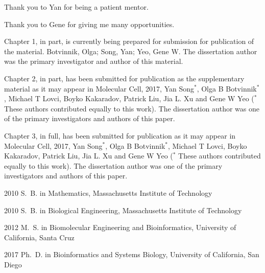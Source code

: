 \begin{frontmatter}
\listoffigures  %
\listoftables   %



%
%
\begin{acknowledgements}
Thank you to Yan for being a patient mentor.
 
Thank you to Gene for giving me many opportunities.

Chapter 1, in part, is currently being prepared for submission for publication of the material. Botvinnik, Olga; Song, Yan; Yeo, Gene W. The dissertation author was the primary investigator and author of this material. 
 
Chapter 2, in part, has been submitted for publication as the supplementary material as it may appear in Molecular Cell, 2017, Yan Song$^*$, Olga B Botvinnik$^*$, Michael T Lovci, Boyko Kakaradov, Patrick Liu, Jia L. Xu and Gene W Yeo ($^*$ These authors contributed equally to this work).  The dissertation author was one of the primary investigators and authors of this paper. 

Chapter 3, in full, has been submitted for publication as it may appear in Molecular Cell, 2017, Yan Song$^*$, Olga B Botvinnik$^*$, Michael T Lovci, Boyko Kakaradov, Patrick Liu, Jia L. Xu and Gene W Yeo ($^*$ These authors contributed equally to this work).  The dissertation author was one of the primary investigators and authors of this paper. 

\end{acknowledgements}


%
%
\begin{vitapage}
\begin{vita}
  \item[2010] S.~B. in Mathematics, Massachusetts Institute of Technology
  \item[2010] S.~B. in Biological Engineering, Massachusetts Institute of Technology
  \item[2012] M.~S. in Biomolecular Engineering and Bioinformatics, University of California, Santa Cruz
  \item[2017] Ph.~D. in Bioinformatics and Systems Biology, University of California, San Diego
\end{vita}


\end{vitapage}
\end{frontmatter}
